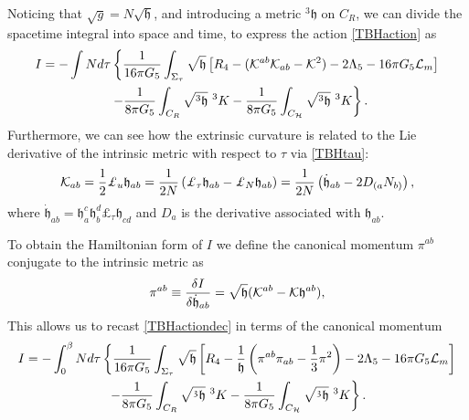 \documentclass[aps,12pt,prd,superscriptaddress,preprintnumbers, 
	amssymb,
	amsmath,
	notitlepage,
	longbibliography,
	nofootinbib]{revtex4-1}
\newcommand{\be}{\begin{equation}}
\newcommand{\ee}{\end{equation}}
\newcommand{\beal}{\begin{aligned}}
\newcommand{\eeal}{\end{aligned}}
\begin{document}
Noticing that $\sqrt{g}=N\sqrt{\mathfrak{h}}$, and introducing a metric 
${}^3\mathfrak{h}$ on $C_R$,
we can divide the spacetime integral into space and time,
to express the action \eqref{TBHaction} as
\be
\beal
I= - \int N d\tau \left\{ \frac{1}{16\pi G_5} \int_{\Sigma_\tau} \sqrt{\mathfrak{h}}
\left[ R_4 - ({\cal K}^{ab} {\cal K}_{ab} - {\cal K}^2)-2\Lambda_5 
- 16\pi G_5 \mathcal{L}_m \right]  \right.\\ 
\left. - \frac{1}{8\pi G_5} \int_{C_R} \sqrt{{}^3\mathfrak{h}} ~ ^3 K 
- \frac{1}{8\pi G_5} \int_{C_{\cal H}} \sqrt{{}^3\mathfrak{h}} ~ ^3 K \right\}.
\hskip 2cm
\eeal
\label{TBHactiondec}
\ee
Furthermore, we can see how the extrinsic curvature is related to the 
Lie derivative of the intrinsic metric with respect to $\tau$ via 
\eqref{TBHtau}:
\begin{eqnarray} 
{\cal K}_{ab}=\frac{1}{2} \mathsterling_u \mathfrak{h}_{ab}
=\frac{1}{2N} \left( \mathsterling_\tau \mathfrak{h}_{ab} -
\mathsterling_N \mathfrak{h}_{ab} \right) = 
\frac{1}{2N} \left( \dot{\mathfrak{h}}_{ab} - 2 D_{(a}N_{b)} \right),
\label{TBHextreln}
\end{eqnarray} 
where $\dot{\mathfrak{h}}_{ab} = \mathfrak{h}^c_a \mathfrak{h}_b^d 
\mathsterling_\tau \mathfrak{h}_{cd}$ 
and $D_a$ is the derivative associated with $\mathfrak{h}_{ab}$. 

To obtain the Hamiltonian form of $I$ we define the canonical 
momentum $\pi^{ab}$ conjugate to the intrinsic metric as
\begin{equation}
\pi^{ab} \equiv \frac{\delta I }{\delta \dot{\mathfrak{h}}_{ab}}= 
\sqrt{\mathfrak{h}} ({\cal K}^{ab} - {\cal K} \mathfrak{h}^{ab}),
\label{TBHcanmom}
\end{equation}
This allows us to recast \eqref{TBHactiondec} in terms of the canonical momentum
\begin{gather}
I= - \int_0^\beta N d\tau \left\{ 
\frac{1}{16\pi G_5}\int_{\Sigma_\tau} \sqrt{\mathfrak{h}} 
\left[ R_4 -  \frac{1}{\mathfrak{h}}\left( \pi^{ab}\pi_{ab} - 
\frac{1}{3} \pi^2 \right)-2\Lambda_5 - 16\pi G_5 \mathcal{L}_m \right]
\nonumber\right.\\ 
\left. - \frac{1}{8\pi G_5} \int_{C_R} \sqrt{\mathfrak{{}^3h}} ~ ^3 K 
- \frac{1}{8\pi G_5} \int_{C_{\cal H}} \sqrt{\mathfrak{{}^3h}} ~ ^3 K  \right\}.
\end{gather}
\end{document}
